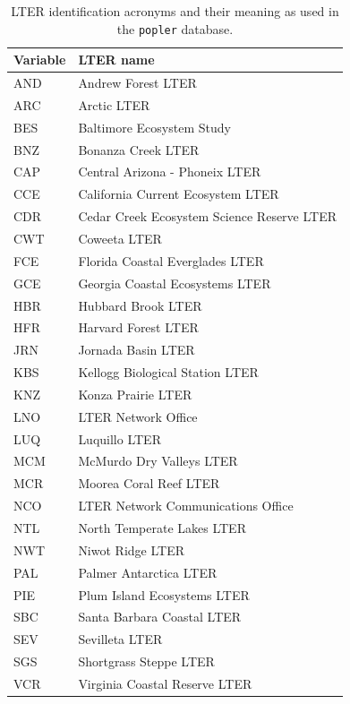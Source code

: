 \documentclass{article}\usepackage[]{graphicx}\usepackage[]{color}
\begin{document}
\newpage
\begin{table}[h!]
  \caption{LTER identification acronyms and their meaning as used in the \texttt{popler} database.}
  \label{Tab:S3}
  \begin{center}
    \begin{tabular}{l l}
      \hline
      Variable & LTER name\\
      \hline
AND & Andrew Forest LTER \\                        
ARC & Arctic LTER \\                               
BES & Baltimore Ecosystem Study \\                 
BNZ & Bonanza Creek LTER \\                        
CAP & Central Arizona - Phoneix LTER \\            
CCE & California Current Ecosystem LTER \\         
CDR & Cedar Creek Ecosystem Science Reserve LTER \\
CWT & Coweeta LTER \\                              
FCE & Florida Coastal Everglades LTER \\           
GCE & Georgia Coastal Ecosystems LTER \\           
HBR & Hubbard Brook LTER \\                        
HFR & Harvard Forest LTER \\                       
JRN & Jornada Basin LTER \\                        
KBS & Kellogg Biological Station LTER \\           
KNZ & Konza Prairie LTER \\                        
LNO & LTER Network Office \\                       
LUQ & Luquillo LTER \\                             
MCM & McMurdo Dry Valleys LTER \\                  
MCR & Moorea Coral Reef LTER \\                    
NCO & LTER Network Communications Office \\        
NTL & North Temperate Lakes LTER \\                
NWT & Niwot Ridge LTER \\                          
PAL & Palmer Antarctica LTER \\                    
PIE & Plum Island Ecosystems LTER \\               
SBC & Santa Barbara Coastal LTER \\                
SEV & Sevilleta LTER  \\                           
SGS & Shortgrass Steppe LTER \\                    
VCR & Virginia Coastal Reserve LTER \\
      \hline
    \end{tabular}
  \end{center}
\end{table}
\end{document}
